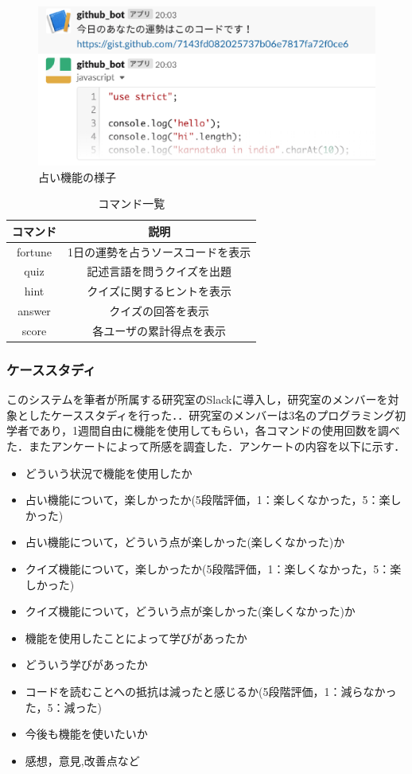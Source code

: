 \begin{figure}[!ht]
  \begin{center}
    \includegraphics[width=0.6\linewidth]{image/prototype_fortune.eps}
  \end{center}
    \vspace{-8mm} 
  \caption{占い機能の様子}
  \label{prototype_fortune}
\end{figure}

\begin{table}[!ht]
  \centering
    \caption{コマンド一覧}
      \begin{tabular}{|c|c|} \hline
        コマンド & 説明 \\ \hline \hline
        fortune & 1日の運勢を占うソースコードを表示 \\ \hline
        quiz & 記述言語を問うクイズを出題 \\ \hline
        hint & クイズに関するヒントを表示 \\ \hline
        answer & クイズの回答を表示 \\ \hline
        score & 各ユーザの累計得点を表示 \\ \hline
      \end{tabular}
    \label{function}
  \end{table}

\subsubsection{ケーススタディ}
このシステムを筆者が所属する研究室のSlackに導入し，研究室のメンバーを対象としたケーススタディを行った．．研究室のメンバーは3名のプログラミング初学者であり，1週間自由に機能を使用してもらい，各コマンドの使用回数を調べた．またアンケートによって所感を調査した．アンケートの内容を以下に示す．

\begin{itemize}
  \item どういう状況で機能を使用したか
  \item 占い機能について，楽しかったか(5段階評価，1：楽しくなかった，5：楽しかった)
  \item 占い機能について，どういう点が楽しかった(楽しくなかった)か
  \item クイズ機能について，楽しかったか(5段階評価，1：楽しくなかった，5：楽しかった)
  \item クイズ機能について，どういう点が楽しかった(楽しくなかった)か
  \item 機能を使用したことによって学びがあったか
  \item どういう学びがあったか
  \item コードを読むことへの抵抗は減ったと感じるか(5段階評価，1：減らなかった，5：減った)
  \item 今後も機能を使いたいか
  \item 感想，意見,改善点など
\end{itemize}

